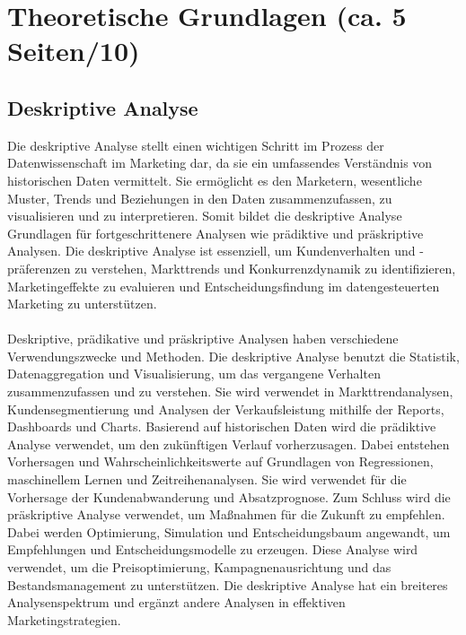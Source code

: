 \newpage
\section{Theoretische Grundlagen (ca. 5 Seiten/10)}
\label{TheoretischeGrundlagen}
\subsection{Deskriptive Analyse}
\label{deskriptiveanalyse}
Die deskriptive Analyse stellt einen wichtigen Schritt im Prozess der Datenwissenschaft im Marketing dar, da sie ein umfassendes Verständnis von historischen Daten vermittelt. Sie ermöglicht es den Marketern, wesentliche Muster, Trends und Beziehungen in den Daten zusammenzufassen, zu visualisieren und zu interpretieren. Somit bildet die deskriptive Analyse Grundlagen für fortgeschrittenere Analysen wie prädiktive und präskriptive Analysen. Die deskriptive Analyse ist essenziell, um Kundenverhalten und -präferenzen zu verstehen, Markttrends und Konkurrenzdynamik zu identifizieren, Marketingeffekte zu evaluieren und Entscheidungsfindung im datengesteuerten Marketing zu unterstützen\cite{brown2024mastering}. \\\\
Deskriptive, prädikative und präskriptive Analysen haben verschiedene Verwendungszwecke und Methoden. Die deskriptive Analyse benutzt die Statistik, Datenaggregation und Visualisierung, um das vergangene Verhalten zusammenzufassen und zu verstehen. Sie wird verwendet in Markttrendanalysen, Kundensegmentierung und Analysen der Verkaufsleistung mithilfe der Reports, Dashboards und Charts. Basierend auf historischen Daten wird die prädiktive Analyse verwendet, um den zukünftigen Verlauf vorherzusagen. Dabei entstehen Vorhersagen und Wahrscheinlichkeitswerte auf Grundlagen von Regressionen, maschinellem Lernen und Zeitreihenanalysen. Sie wird verwendet für die Vorhersage der Kundenabwanderung und Absatzprognose. Zum Schluss wird die präskriptive Analyse verwendet, um Maßnahmen für die Zukunft zu empfehlen. Dabei werden Optimierung, Simulation und Entscheidungsbaum angewandt, um Empfehlungen und Entscheidungsmodelle zu erzeugen. Diese Analyse wird verwendet, um die Preisoptimierung, Kampagnenausrichtung und das Bestandsmanagement zu unterstützen. Die deskriptive Analyse hat ein breiteres Analysenspektrum und ergänzt andere Analysen in effektiven Marketingstrategien\cite[S. 51 ff]{brown2024mastering}. 



